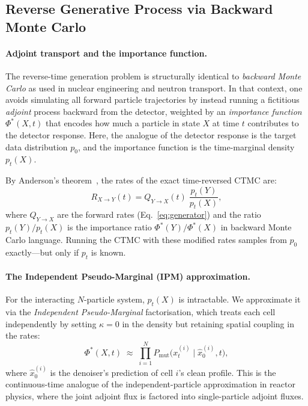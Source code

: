 \documentclass[11pt]{article}
\begin{document}
\subsection{Reverse Generative Process via Backward Monte Carlo}

\paragraph{Adjoint transport and the importance function.}
The reverse-time generation problem is structurally identical to \emph{backward Monte Carlo} as used in nuclear engineering and neutron transport.
In that context, one avoids simulating all forward particle trajectories by instead running a fictitious \emph{adjoint} process backward from the detector, weighted by an \emph{importance function} $\Phi^*(X, t)$ that encodes how much a particle in state $X$ at time $t$ contributes to the detector response.
Here, the analogue of the detector response is the target data distribution $p_0$, and the importance function is the time-marginal density $p_t(X)$.

By Anderson's theorem~\citep{anderson1982reverse}, the rates of the exact time-reversed CTMC are:
\begin{equation}
  R_{X \to Y}(t) = Q_{Y \to X}(t)\;\frac{p_t(Y)}{p_t(X)},
  \label{eq:anderson}
\end{equation}
where $Q_{Y \to X}$ are the forward rates (Eq.~\ref{eq:generator}) and the ratio $p_t(Y)/p_t(X)$ is the importance ratio $\Phi^*(Y)/\Phi^*(X)$ in backward Monte Carlo language.
Running the CTMC with these modified rates samples from $p_0$ exactly---but only if $p_t$ is known.

\paragraph{The Independent Pseudo-Marginal (IPM) approximation.}
For the interacting $N$-particle system, $p_t(X)$ is intractable.
We approximate it via the \emph{Independent Pseudo-Marginal} factorisation, which treats each cell independently by setting $\kappa=0$ in the density but retaining spatial coupling in the rates:
\begin{equation}
  \Phi^*(X, t) \;\approx\; \prod_{i=1}^{N} P_{\text{mut}}\!\bigl(x^{(i)}_t \mid \hat{x}_0^{(i)}, t\bigr),
  \label{eq:ipm}
\end{equation}
where $\hat{x}_0^{(i)}$ is the denoiser's prediction of cell $i$'s clean profile.
This is the continuous-time analogue of the independent-particle approximation in reactor physics, where the joint adjoint flux is factored into single-particle adjoint fluxes.
\end{document}
